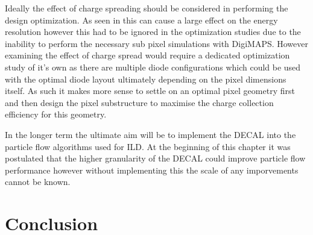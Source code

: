 Ideally the effect of charge spreading should be considered in performing the design optimization. As seen in  this can cause a large effect on the energy resolution however this had to be ignored in the optimization studies due to the inability to perform the necessary sub pixel simulations with DigiMAPS. However examining the effect of charge spread would require a dedicated optimization study of it's own as there are multiple diode configurations which could be used with the optimal diode layout ultimately depending on the pixel dimensions itself. As such it makes more sense to settle on an optimal pixel geometry first and then design the pixel substructure to maximise the charge collection efficiency for this geometry.

In the longer term the ultimate aim will be to implement the \ac{DECAL} into the particle flow algorithms used for \ac{ILD}. At the beginning of this chapter it was postulated that the higher granularity of the \ac{DECAL} could improve particle flow performance however without implementing this the scale of any imporvements cannot be known.



\section{Conclusion}

